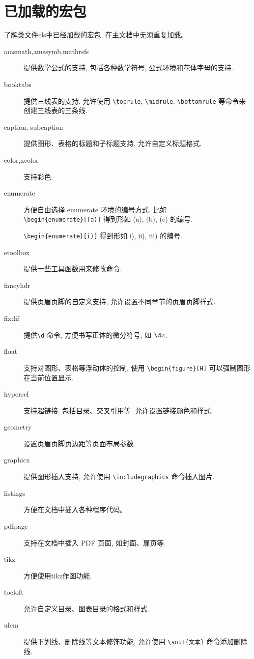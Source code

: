 \section{已加载的宏包}
了解类文件cls中已经加载的宏包, 在主文档中无须重复加载。
\begin{description}
    \item[amsmath,amssymb,mathrsfs]  提供数学公式的支持, 包括各种数学符号, 公式环境和花体字母的支持.
    \item[booktabs]  提供三线表的支持, 允许使用 \verb|\toprule|, \verb|\midrule|, \verb|\bottomrule| 等命令来创建三线表的三条线.
    \item[caption, subcaption] 提供图形、表格的标题和子标题支持, 允许自定义标题格式.
    \item[color,xcolor]  支持彩色.
    \item[enumerate]  方便自由选择 enumerate 环境的编号方式. 比如\\
          \verb|\begin{enumerate}[(a)]| 得到形如 (a), (b), (c) 的编号.

          \verb|\begin{enumerate}[i)]| 得到形如 i), ii), iii) 的编号.
    \item[etoolbox]  提供一些工具函数用来修改命令.
            \item[fancyhdr]  提供页眉页脚的自定义支持, 允许设置不同章节的页眉页脚样式.
    \item[fixdif] 提供\verb|\d| 命令, 方便书写正体的微分符号, 如 $\d x$.
    \item[float] 支持对图形、表格等浮动体的控制, 使用 \verb|\begin{figure}[H]| 可以强制图形在当前位置显示.
    \item[hyperref]  支持超链接, 包括目录、交叉引用等. 允许设置链接颜色和样式.
    \item[geometry] 设置页眉页脚页边距等页面布局参数.
    \item[graphicx]  提供图形插入支持, 允许使用 \verb|\includegraphics| 命令插入图片.
    \item[listings] 方便在文档中插入各种程序代码。
    \item[pdfpage] 支持在文档中插入 PDF 页面, 如封面、扉页等.
    \item[tikz] 方便使用tikz作图功能.
    \item[tocloft] 允许自定义目录、图表目录的格式和样式.
    \item[ulem] 提供下划线、删除线等文本修饰功能, 允许使用 \verb|\sout{文本}| 命令添加删除线.

\end{description}

